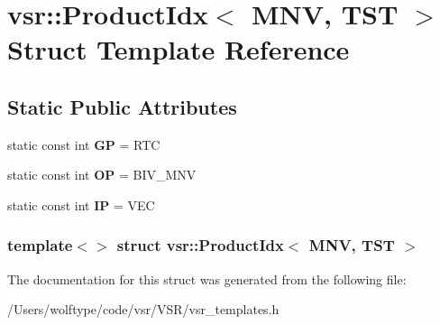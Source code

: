 \hypertarget{structvsr_1_1_product_idx_3_01_m_n_v_00_01_t_s_t_01_4}{\section{vsr\-:\-:Product\-Idx$<$ M\-N\-V, T\-S\-T $>$ Struct Template Reference}
\label{structvsr_1_1_product_idx_3_01_m_n_v_00_01_t_s_t_01_4}
}
\subsection*{Static Public Attributes}
\begin{DoxyCompactItemize}
\item 
\hypertarget{structvsr_1_1_product_idx_3_01_m_n_v_00_01_t_s_t_01_4_a2eea8688fbcd506b887597872638809b}{static const int {\bfseries G\-P} = R\-T\-C}\label{structvsr_1_1_product_idx_3_01_m_n_v_00_01_t_s_t_01_4_a2eea8688fbcd506b887597872638809b}

\item 
\hypertarget{structvsr_1_1_product_idx_3_01_m_n_v_00_01_t_s_t_01_4_aa3c629dab63f20b5e23ed4a76f5b89e7}{static const int {\bfseries O\-P} = B\-I\-V\-\_\-\-M\-N\-V}\label{structvsr_1_1_product_idx_3_01_m_n_v_00_01_t_s_t_01_4_aa3c629dab63f20b5e23ed4a76f5b89e7}

\item 
\hypertarget{structvsr_1_1_product_idx_3_01_m_n_v_00_01_t_s_t_01_4_aa45fb6d95d05393e7826c0ad0a47fbec}{static const int {\bfseries I\-P} = V\-E\-C}\label{structvsr_1_1_product_idx_3_01_m_n_v_00_01_t_s_t_01_4_aa45fb6d95d05393e7826c0ad0a47fbec}

\end{DoxyCompactItemize}
\subsubsection*{template$<$$>$ struct vsr\-::\-Product\-Idx$<$ M\-N\-V, T\-S\-T $>$}



The documentation for this struct was generated from the following file\-:\begin{DoxyCompactItemize}
\item 
/\-Users/wolftype/code/vsr/\-V\-S\-R/vsr\-\_\-templates.\-h\end{DoxyCompactItemize}
